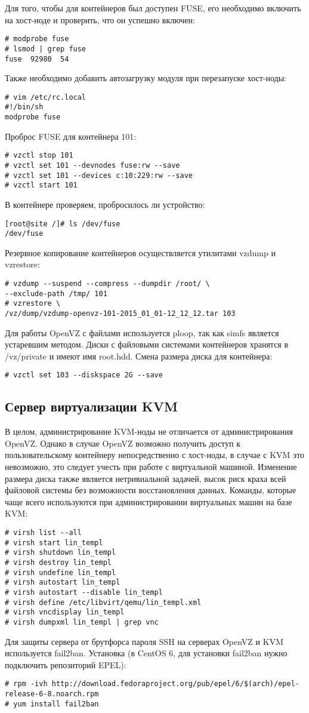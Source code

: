 Для того, чтобы для контейнеров был доступен FUSE, его необходимо включить на хост-ноде и проверить, что он успешно включен:
\begin{lstlisting}
# modprobe fuse
# lsmod | grep fuse
fuse  92980  54
\end{lstlisting}
Также необходимо добавить автозагрузку модуля при перезапуске хост-ноды:
\begin{lstlisting}
# vim /etc/rc.local
#!/bin/sh
modprobe fuse
\end{lstlisting}
Проброс FUSE для контейнера 101:
\begin{lstlisting}
# vzctl stop 101
# vzctl set 101 --devnodes fuse:rw --save
# vzctl set 101 --devices c:10:229:rw --save
# vzctl start 101
\end{lstlisting}
В контейнере проверяем, пробросилось ли устройство:
\begin{lstlisting}
[root@site /]# ls /dev/fuse
/dev/fuse
\end{lstlisting}
Резервное копирование контейнеров осуществляется утилитами vzdump и vzrestore:
\begin{lstlisting}
# vzdump --suspend --compress --dumpdir /root/ \
--exclude-path /tmp/ 101
# vzrestore \
/vz/dump/vzdump-openvz-101-2015_01_01-12_12_12.tar 103
\end{lstlisting}
Для работы OpenVZ с файлами используется ploop, так как simfs является устаревшим методом.
Диски с файловыми системами контейнеров хранятся в /vz/private и имеют имя root.hdd.
Смена размера диска для контейнера:
\begin{lstlisting}
# vzctl set 103 --diskspace 2G --save
\end{lstlisting}
\subsection{Сервер виртуализации KVM}
В целом, администрирование KVM-ноды не отличается от администрирования OpenVZ.
Однако в случае OpenVZ возможно получить доступ к пользовательскому контейнеру непосредственно с хост-ноды, в случае с KVM это невозможно, это следует учесть при работе с виртуальной машиной.
Изменение размера диска также является нетривиальной задачей, высок риск краха всей файловой системы без возможности восстановления данных.
Команды, которые чаще всего используются при администрировании виртуальных машин на базе KVM:
\begin{lstlisting}
# virsh list --all
# virsh start lin_templ
# virsh shutdown lin_templ
# virsh destroy lin_templ
# virsh undefine lin_templ
# virsh autostart lin_templ
# virsh autostart --disable lin_templ
# virsh define /etc/libvirt/qemu/lin_templ.xml
# virsh vncdisplay lin_templ
# virsh dumpxml lin_templ | grep vnc
\end{lstlisting}
Для защиты сервера от брутфорса пароля SSH на серверах OpenVZ и KVM используется fail2ban.
Установка (в CentOS 6, для установки fail2ban нужно подключить репозиторий EPEL):
\begin{lstlisting}
# rpm -ivh http://download.fedoraproject.org/pub/epel/6/$(arch)/epel-release-6-8.noarch.rpm
# yum install fail2ban
\end{lstlisting}

